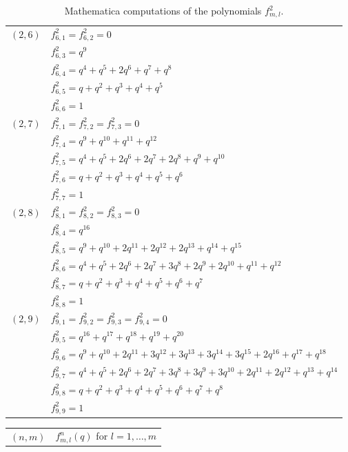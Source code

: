 \documentclass[a4paper,10pt]{article}
\begin{document}
\begin{appendix}
\begin{table}[H]
\begin{tabular}{|c|l|}
\hline
$(2,6)$ & 
$f^2_{6,1} = f^2_{6,2} = 0$ \\
        & $f^2_{6,3} = q^9$ \\
        & $f^2_{6,4} = q^4 + q^5 + 2q^6 + q^7 + q^8$ \\
        & $f^2_{6,5} = q + q^2 + q^3 + q^4 + q^5$ \\
        & $f^2_{6,6} = 1$ \\
\hline
$(2,7)$ & 
$f^2_{7,1} = f^2_{7,2} = f^2_{7,3} = 0$ \\
        & $f^2_{7,4} = q^9 + q^{10} + q^{11} + q^{12}$ \\
        & $f^2_{7,5} = q^4 + q^5 + 2q^6 + 2q^7 + 2q^8 + q^9 + q^{10}$ \\
        & $f^2_{7,6} = q + q^2 + q^3 + q^4 + q^5 + q^6$ \\
        & $f^2_{7,7} = 1$ \\
\hline
$(2,8)$ & 
$f^2_{8,1} = f^2_{8,2} = f^2_{8,3} = 0$ \\
        & $f^2_{8,4} = q^{16}$ \\
        & $f^2_{8,5} = q^9 + q^{10} + 2q^{11} + 2q^{12} + 2q^{13} + q^{14} + q^{15}$ \\
        & $f^2_{8,6} = q^4 + q^5 + 2q^6 + 2q^7 + 3q^8 + 2q^9 + 2q^{10} + q^{11} + q^{12}$ \\
        & $f^2_{8,7} = q + q^2 + q^3 + q^4 + q^5 + q^6 + q^7$ \\
        & $f^2_{8,8} = 1$ \\
\hline
$(2,9)$ & 
$f^2_{9,1} = f^2_{9,2} = f^2_{9,3} = f^2_{9,4} = 0$ \\
        & $f^2_{9,5} = q^{16} + q^{17} + q^{18} + q^{19} + q^{20}$ \\
        & $f^2_{9,6} = q^9 + q^{10} + 2q^{11} + 3q^{12} + 3q^{13} + 3q^{14} + 3q^{15} + 2q^{16} + q^{17} + q^{18}$ \\
        & $f^2_{9,7} = q^4 + q^5 + 2q^6 + 2q^7 + 3q^8 + 3q^9 + 3q^{10} + 2q^{11} + 2q^{12} + q^{13} + q^{14}$ \\
        & $f^2_{9,8} = q + q^2 + q^3 + q^4 + q^5 + q^6 + q^7 + q^8$ \\
        & $f^2_{9,9} = 1$ \\
\hline
\end{tabular}
    \caption{Mathematica computations of the polynomials $f^2_{m,l}$.}
    \label{tab:my_label}
\end{table}
\begin{table}[H]
    \centering
    \begin{tabular}{|c|l|}
    \hline
    $(n,m)$ & $f^n_{m,l}(q)$ for $l=1,\dots,m$

\end{tabular}
\end{table}
\end{appendix}
\end{document}
